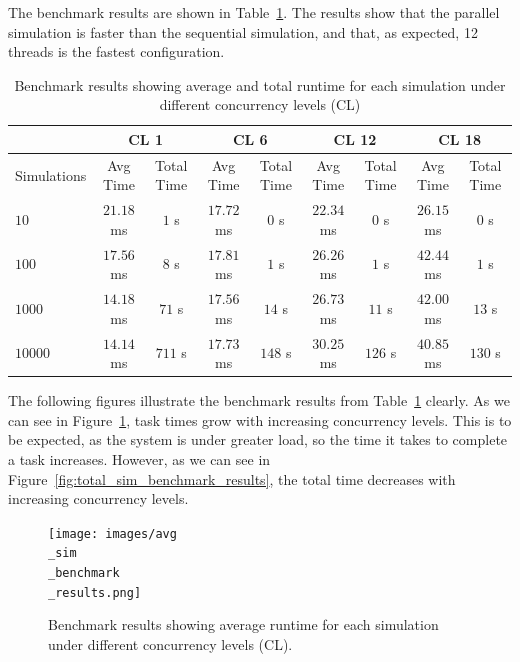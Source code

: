 The benchmark results are shown in Table~\ref{tab:benchmark_results}.
The results show that the parallel simulation is faster than the sequential simulation, and that, as expected, 12 threads is the fastest configuration.


\begin{table}[htbp]
\centering
\begin{tabular}{|l|c|c|c|c|c|c|c|c|}
\hline
 & \multicolumn{2}{c|}{CL 1} & \multicolumn{2}{c|}{CL 6} & \multicolumn{2}{c|}{CL 12} & \multicolumn{2}{c|}{CL 18} \\
\hline
Simulations & Avg Time & Total Time & Avg Time & Total Time & Avg Time & Total Time & Avg Time & Total Time \\
\hline
$10$ & $21$.$18$ ms & $1$ s & $17$.$72$ ms & $0$ s & $22$.$34$ ms & $0$ s & $26$.$15$ ms & $0$ s \\
\hline
$100$ & $17$.$56$ ms & $8$ s & $17$.$81$ ms & $1$ s & $26$.$26$ ms & $1$ s & $42$.$44$ ms & $1$ s \\
\hline
$1000$ & $14$.$18$ ms & $71$ s & $17$.$56$ ms & $14$ s & $26$.$73$ ms & $11$ s & $42$.$00$ ms & $13$ s \\
\hline
$10000$ & $14$.$14$ ms & $711$ s & $17$.$73$ ms & $148$ s & $30$.$25$ ms & $126$ s & $40$.$85$ ms & $130$ s \\
\hline
\end{tabular}
\caption{Benchmark results showing average and total runtime for each simulation under different concurrency levels (CL)}
\label{tab:benchmark_results}
\end{table}

The following figures illustrate the benchmark results from Table~\ref{tab:benchmark_results} clearly.
As we can see in Figure~\ref{fig:avg_sim_benchmark_results}, task times grow with increasing concurrency levels.
This is to be expected, as the system is under greater load, so the time it takes to complete a task increases.
However, as we can see in Figure~\ref{fig:total_sim_benchmark_results}, the total time decreases with increasing concurrency levels.

\begin{figure}[H]
\centering
\texttt{[image: images/avg\\\_sim\\\_benchmark\\\_results.png]}
\caption{Benchmark results showing average runtime for each simulation under different concurrency levels (CL).}
\label{fig:avg_sim_benchmark_results}
\end{figure}

